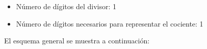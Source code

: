 \documentclass[svgnames,addpoints]{exam}
\newlength{\zerowidth}
\newlength{\zeroheight}
\begin{document}
\begin{questions}
\begin{itemize}
  \item Número de dígitos del divisor: 1
    
  \item Número de dígitos necesarios para representar el cociente: 1
    
  \end{itemize}

  El esquema general se muestra a continuación:

  \noindent\begin{minipage}{0.25\linewidth}
    \begin{center}
\end{center}
\end{minipage}
\end{questions}
\end{document}
